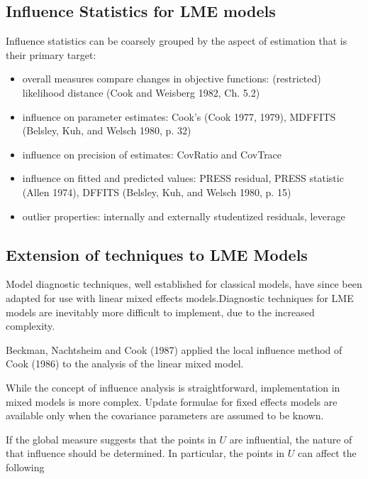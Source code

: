 \documentclass[12pt, a4paper]{article}
\begin{document}
\subsection{Influence Statistics for LME models} %
Influence statistics can be coarsely grouped by the aspect of estimation that is their primary target:
\begin{itemize}
	\item overall measures compare changes in objective functions: (restricted) likelihood distance (Cook and Weisberg 1982, Ch. 5.2)
	\item influence on parameter estimates: Cook's  (Cook 1977, 1979), MDFFITS (Belsley, Kuh, and Welsch 1980, p. 32)
	\item influence on precision of estimates: CovRatio and CovTrace
	\item influence on fitted and predicted values: PRESS residual, PRESS statistic (Allen 1974), DFFITS (Belsley, Kuh, and Welsch 1980, p. 15)
	\item outlier properties: internally and externally studentized residuals, leverage
\end{itemize}





\subsection{Extension of techniques to LME Models} %


Model diagnostic techniques, well established for classical models, have since been adapted for use with linear mixed effects models.Diagnostic techniques for LME models are inevitably more difficult to implement, due to the increased complexity.


Beckman, Nachtsheim and Cook (1987) \citet{Beckman} applied the local influence method of Cook (1986) to the analysis of the linear mixed model.


While the concept of influence analysis is straightforward, implementation in mixed models is more complex. Update formulae for fixed effects models are available only when the covariance parameters are assumed to be known.


If the global measure suggests that the points in $U$ are influential, the nature of that influence should be determined. In particular, the points in $U$ can affect the following
\end{document}

